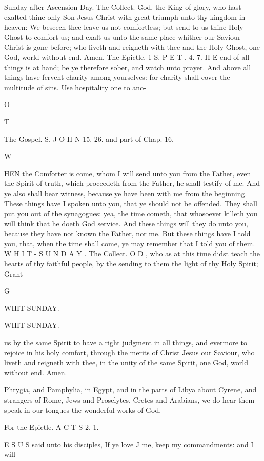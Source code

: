 Sunday after Ascension-Day. The Collect. God, the King of glory, who hast exalted thine only Son Jesus Christ with great triumph unto thy kingdom in heaven: We beseech thee leave us not comfortless; but send to us thine Holy Ghost to comfort us; and exalt us unto the same place whither our Saviour Christ is gone before; who liveth and reigneth with thee and the Holy Ghost, one God, world without end. Amen. The Epictle. 1 S. P E T . 4. 7. H E end of all things is at hand; be ye therefore sober, and watch unto prayer. And above all things have fervent charity among yourselves: for charity shall cover the multitude of sins. Use hospitality one to ano-

O

T

The Gospel. S. J O H N 15. 26. and part of Chap. 16.

W

HEN the Comforter is come, whom I will send unto you from the Father, even the Spirit of truth, which proceedeth from the Father, he shall testify of me. And ye also shall bear witness, because ye have been with me from the beginning. These things have I spoken unto you, that ye should not be offended. They shall put you out of the synagogues: yea, the time cometh, that whosoever killeth you will think that he doeth God service. And these things will they do unto you, because they have not known the Father, nor me. But these things have I told you, that, when the time shall come, ye may remember that I told you of them. W H I T - S U N D A Y . The Collect. O D , who as at this time didst teach the hearts of thy faithful people, by the sending to them the light of thy Holy Spirit; Grant

G

WHIT-SUNDAY.

WHIT-SUNDAY.

us by the same Spirit to have a right judgment in all things, and evermore to rejoice in his holy comfort, through the merits of Christ Jesus our Saviour, who liveth and reigneth with thee, in the unity of the same Spirit, one God, world without end. Amen.

Phrygia, and Pamphylia, in Egypt, and in the parts of Libya about Cyrene, and strangers of Rome, Jews and Proselytes, Cretes and Arabians, we do hear them speak in our tongues the wonderful works of God.

For the Epictle. A C T S 2. 1.

E S U S said unto his disciples, If ye love J me, keep my commandments: and I will

